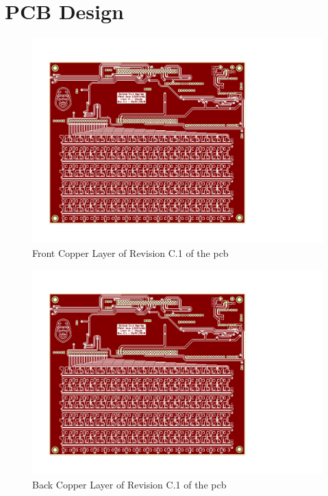 \documentclass[12pt,a4paper]{report}
\begin{document}
\chapter{PCB Design} \label{sec:PCB}
\begin{figure}[h!]
	\begin{center}
		\includegraphics[width = \textwidth, trim={0.69in 0.78in 3.1in 0.95in}, clip]{../Skripsie/PCB_05042019.pdf}
		\caption{Front Copper Layer of Revision C.1 of the \ac{pcb}}
		\label{fig:frontpcb}
	\end{center}
\end{figure}
\begin{figure}[h!]
	\begin{center}
		\includegraphics[page=2, width = \textwidth, trim={0.69in 0.78in 3.1in 0.95in}, clip]{../Skripsie/PCB_05042019.pdf}
		\caption{Back Copper Layer of Revision C.1 of the \ac{pcb}}
		\label{fig:backpcb}
	\end{center}
\end{figure}
\end{document}
